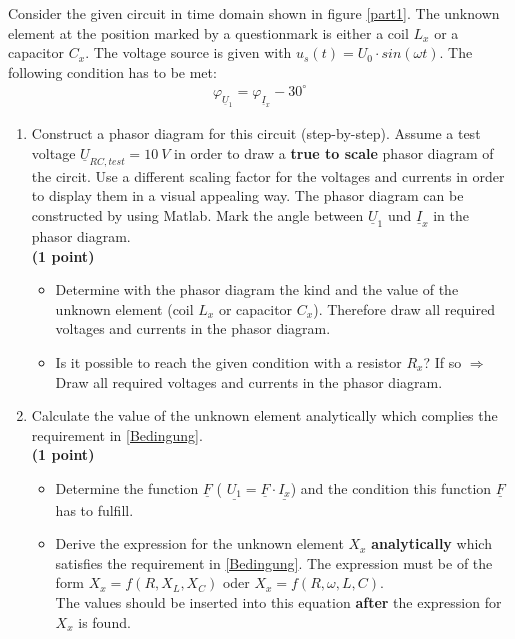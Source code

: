 \documentclass[a4paper]{article}
\begin{document}
	Consider the given circuit in time domain shown in figure \ref{part1}. The unknown element at the position marked by a questionmark is either a coil $L_x$ or a capacitor $C_x$. The voltage source is given with $u_s(t) = U_0 \cdot sin(\omega t)$. The following condition has to be met: 
	\begin{align}
		\label{Bedingung}
		\varphi_{\underline{U}_1}=\varphi_{\underline{I}_x}-30^\circ
	\end{align}
	\begin{enumerate}
		\item Construct a phasor diagram for this circuit (step-by-step). Assume a test voltage $\underline{U}_{RC,test} = 10~V$ in order to draw a \textbf{true to scale} phasor diagram of the circit. Use a different scaling factor for the voltages and currents in order to display them in a visual appealing way. The phasor diagram can be constructed by using Matlab. Mark the angle between $\underline{U}_1$ und $\underline{I}_x$ in the phasor diagram. \\\textbf{(1 point)}
		\begin{itemize}
			\item Determine with the phasor diagram the kind and the value of the unknown element (coil $L_x$ or capacitor $C_x$). Therefore draw all required voltages and currents in the phasor diagram.
			\item Is it possible to reach the given condition with a resistor $R_x$? If so $\Rightarrow$ Draw all required voltages and currents in the phasor diagram.
		\end{itemize}
		\item Calculate the value of the unknown element analytically which complies the requirement in \ref{Bedingung}. \\\textbf{(1 point)}
		\begin{itemize}
			\item Determine the function $\underline{F}$ ( $\underline{U_1} = \underline{F} \cdot \underline{I_x}$)  and the condition this function  $\underline{F}$ has to fulfill.
			\item Derive the expression for the unknown element $X_x$ \textbf{analytically} which satisfies the requirement in \ref{Bedingung}. The expression must be of the form $X_x = f(R, X_L, X_C)$ oder $X_x = f(R, \omega, L, C)$.\\
			The values should be inserted into this equation \textbf{after} the expression for $X_x$ is found.
		\end{itemize}
		

\end{enumerate}
\end{document}
